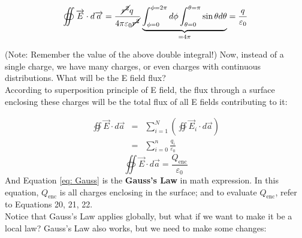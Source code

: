 \documentclass[12pt,a4paper,twoside]{article}
\numberwithin{equation}{section}
\begin{document}
    \[\oiint \overrightarrow{E}\cdot d\overrightarrow{a}=\frac{\cancel{r^2}q}{4\pi\varepsilon_0\cancel{r^2}}\underbrace{\int_{\phi=0}^{\phi=2\pi}d\phi\int_{\theta=0}^{\theta=\pi}\sin\theta d\theta}_{=4\pi}=\frac{q}{\varepsilon_0}\]
    
    (Note: Remember the value of the above double integral!)
    \newline
    \noindent Now, instead of a single charge, we have many charges, or even charges with continuous distributions. What will be the E field flux?\\
    \newline
    \noindent According to superposition principle of E field, the flux through a surface enclosing these charges will be the total flux of all E fields contributing to it:

        \begin{eqnarray*}
            \oiint \overrightarrow{E} \cdot d\overrightarrow{a} &=& \sum_{i=1}^{N}\left(\oiint \overrightarrow{E}_i \cdot d\overrightarrow{a}\right)  \\
            &=& \sum_{i=0}^{n}\frac{q_i}{\varepsilon_0}
        \end{eqnarray*}
        \begin{equation}
            \oiint \overrightarrow{E} \cdot d\overrightarrow{a}=\frac{Q_{\mathrm{enc}}}{\varepsilon_0}
            \label{eq: Gauss}
        \end{equation}
    And Equation \ref{eq: Gauss} is the \textbf{Gauss's Law} in math expression. In this equation, $Q_{\mathrm{enc}}$ is all charges enclosing in the surface; and to evaluate $Q_{\mathrm{enc}}$, refer to Equations 20, 21, 22.\\
    \newline
    \noindent Notice that Gauss's Law applies globally, but what if we want to make it be a local law? Gauss's Law also works, but we need to make some changes:
\end{document}
